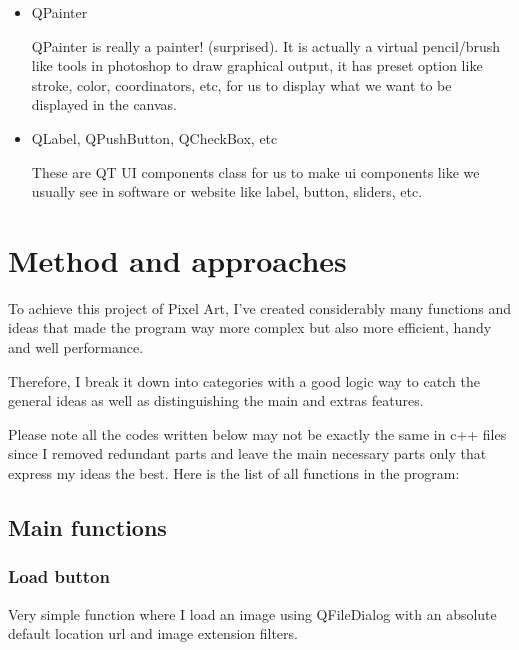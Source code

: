 \documentclass[english]{article}
\begin{document}
{\begin{itemize}
		QImage and QPixmap somehow share similar functions and both used to store image data. These are 2 main Classes we used to manipulate image in QT.
		
		\item QPainter
		
		QPainter is really a painter! (surprised). It is actually a virtual pencil/brush like tools in photoshop to draw graphical output, it has preset option like stroke, color, coordinators, etc, for us to display what we want to be displayed in the canvas.
		
		\item QLabel, QPushButton, QCheckBox, etc
		
		These are QT UI components class for us to make ui components like we usually see in software or website like label, button, sliders, etc.
		
	\end{itemize}



\newpage


\section{Method and approaches}

To achieve this project of Pixel Art, I've created considerably many functions and ideas that made the program way more complex but also more efficient, handy and well performance. \newline

Therefore, I break it down into categories with a good logic way to catch the general ideas as well as distinguishing the main and extras features. \newline

Please note all the codes written below may not be exactly the same in c++ files since I removed redundant parts and leave the main necessary parts only that express my ideas the best. Here is the list of all functions in the program:
\subsection{Main functions}

\subsubsection{Load button}
Very simple function where I load an image using QFileDialog with an absolute default location url and image extension filters.


}
\end{document}
